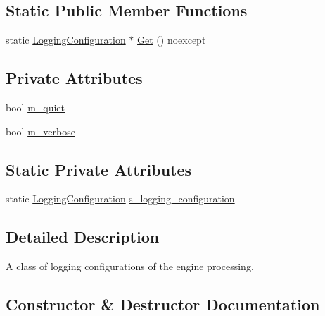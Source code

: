\subsection*{Static Public Member Functions}
\begin{DoxyCompactItemize}
\item 
static \hyperlink{classmage_1_1_logging_configuration}{Logging\+Configuration} $\ast$ \hyperlink{classmage_1_1_logging_configuration_a9a2b9343e49bd5befe10cf06225e5c83}{Get} () noexcept
\end{DoxyCompactItemize}
\subsection*{Private Attributes}
\begin{DoxyCompactItemize}
\item 
bool \hyperlink{classmage_1_1_logging_configuration_a38f457d5db84d15e008841ca8653b47c}{m\+\_\+quiet}
\item 
bool \hyperlink{classmage_1_1_logging_configuration_a60f052c2bb702d8153188e93f00427ac}{m\+\_\+verbose}
\end{DoxyCompactItemize}
\subsection*{Static Private Attributes}
\begin{DoxyCompactItemize}
\item 
static \hyperlink{classmage_1_1_logging_configuration}{Logging\+Configuration} \hyperlink{classmage_1_1_logging_configuration_a056b2250472f997de3d99dcfc3c02940}{s\+\_\+logging\+\_\+configuration}
\end{DoxyCompactItemize}


\subsection{Detailed Description}
A class of logging configurations of the engine processing. 

\subsection{Constructor \& Destructor Documentation}
\hypertarget{classmage_1_1_logging_configuration_a506696943c69d6a56ceef5802e0546ba}{}\label{classmage_1_1_logging_configuration_a506696943c69d6a56ceef5802e0546ba} 
